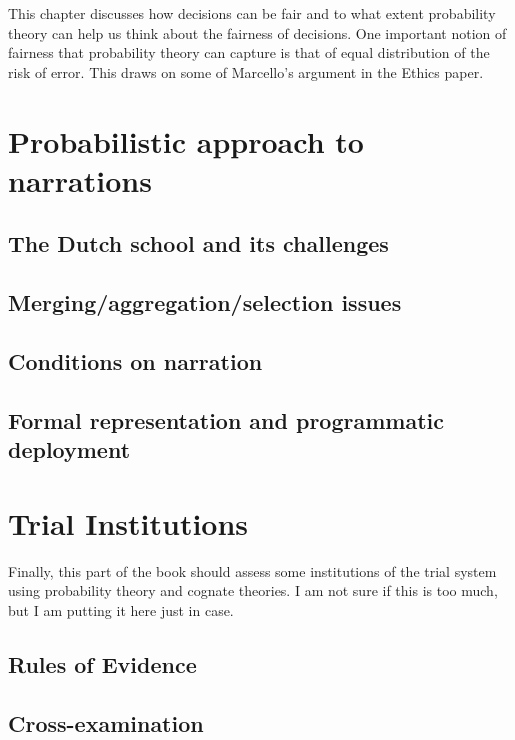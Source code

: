 \documentclass[]{book}
\begin{document}
This chapter discusses how decisions can be fair and to what extent
probability theory can help us think about the fairness of decisions.
One important notion of fairness that probability theory can capture is
that of equal distribution of the risk of error. This draws on some of
Marcello's argument in the Ethics paper.


\part{Probabilistic approach to narrations}

\chapter{The Dutch school and its challenges}

\chapter{Merging/aggregation/selection issues}

\chapter{Conditions on narration}

\chapter{Formal representation and programmatic deployment}

\part{Trial Institutions}

Finally, this part of the book should assess some institutions of the
trial system using probability theory and cognate theories. I am not
sure if this is too much, but I am putting it here just in case.


\chapter{Rules of Evidence}

\chapter{Cross-examination}
\end{document}
